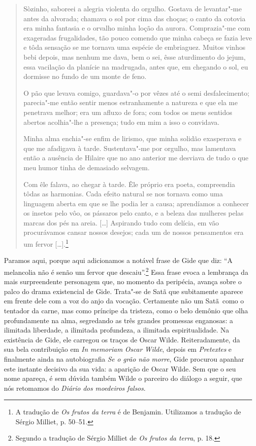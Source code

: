 \begin{quote}
Sòzinho, saboreei a alegria violenta do orgulho. Gostava de
levantar"-me antes da alvorada; chamava o sol por cima das choças; o
canto da cotovia era minha fantasia e o orvalho minha loção da aurora.
Comprazia"-me com exageradas frugalidades, tão pouco comendo que minha
cabeça se fazia leve e tôda sensação se me tornava uma espécie de
embriaguez. Muitos vinhos bebi depois, mas nenhum me dava, bem o sei,
êsse aturdimento do jejum, essa vacilação da planície na madrugada,
antes que, em chegando o sol, eu dormisse no fundo de um monte de feno.

O pão que levava comigo, guardava"-o por vêzes até o semi desfalecimento;
parecia"-me então sentir menos estranhamente a natureza e que ela me
penetrava melhor; era um afluxo de fora; com todos os meus sentidos
abertos acolhia"-lhe a presença; tudo em mim a isso o convidava.

Minha alma enchia"-se enfim de lirismo, que minha solidão exasperava e
que me afadigava à tarde. Sustentava"-me por orgulho, mas lamentava então
a ausência de Hilaire que no ano anterior me desviava de tudo o que meu
humor tinha de demasiado selvagem.

Com êle falava, ao chegar à tarde. Êle próprio era poeta, compreendia
tôdas as harmonias. Cada efeito natural se nos tornava como uma
linguagem aberta em que se lhe podia ler a causa; aprendíamos a conhecer
os insetos pelo vôo, os pássaros pelo canto, e a beleza das mulheres
pelas marcas dos pés na areia. {[}\ldots{}{]} Aspirando tudo com delícia, em
vão procurávamos cansar nossos desejos; cada um de nossos pensamentos
era um fervor {[}\ldots{}{]}.\footnote{A tradução de \emph{Os frutos da
  terra} é de Benjamin. Utilizamos a tradução de Sérgio Milliet,
  p. 50--51. \versal{[N.~T.]}}
  \end{quote}

Paramos aqui, porque aqui adicionamos a notável frase de Gide que diz:
``A melancolia não é senão um fervor que descaiu''.\footnote{Segundo a tradução de Sérgio Milliet de \emph{Os frutos da terra},
  p. 18. \versal{[N.~T.]}} Essa frase evoca a lembrança da mais surpreendente personagem
que, no momento da peripécia, avança sobre o palco do drama existencial de
Gide. Trata"-se de Satã que subitamente aparece em frente dele com a voz do anjo da
vocação. Certamente não um Satã~como o tentador da carne, mas
como príncipe da tristeza, como o belo demônio que olha profundamente na
alma, segredando as três grandes promessas enganosas: a ilimitada liberdade,
a ilimitada profundeza, a ilimitada espiritualidade.
Na existência de Gide, ele carregou os traços de Oscar Wilde. Reiteradamente,
da sua bela contribuição em \emph{In memoriam Oscar Wilde}, depois em
\emph{Pretextes} e finalmente ainda na autobiografia \emph{Se o grão não
morre}, Gide procurou apanhar este instante decisivo da sua vida: a
aparição de Oscar Wilde. Sem que o seu nome apareça, é sem dúvida também
Wilde o parceiro do diálogo a seguir, que nós retomamos do \emph{Diário
dos moedeiros falsos}.

